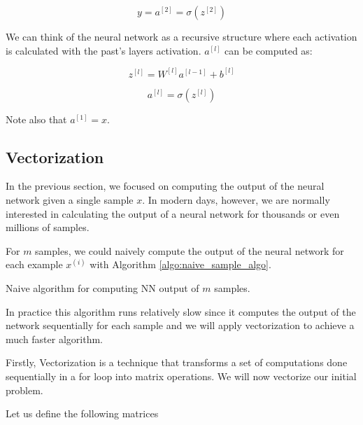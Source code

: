 \begin{equation}
    y = a^{[2]} = \sigma(z^{[2]})
\end{equation}

We can think of the neural network as a recursive structure where each activation is calculated with the past's layers activation.
$a^{[l]}$ can be computed as:

\begin{equation}
    z^{[l]} = W^{[l]}a^{[l-1]} + b^{[l]}
    \label{eq:nn}
\end{equation}

\begin{equation}
    a^{[l]} = \sigma(z^{[l]})
\end{equation}

Note also that $a^{[1]} = x$.

\subsection{Vectorization}

In the previous section, we focused on computing the output of the neural network given a single sample $x$.
In modern days, however,  we are normally interested in calculating the output of a neural network for thousands or even millions of samples.

For $m$ samples, we could naively compute the output of the neural network for each example $x^{(i)}$ with Algorithm \ref{algo:naive_sample_algo}.

\begin{algorithm}[H]
    \DontPrintSemicolon
    \SetAlgoLined
    \caption{Naive algorithm for computing NN output of $m$ samples.}
    \label{algo:naive_sample_algo}
\end{algorithm}

In practice this algorithm runs relatively slow since it computes the output of the network sequentially for each sample and 
we will apply vectorization to achieve a much faster algorithm.

Firstly, Vectorization is a technique that transforms a set of computations done sequentially in a for loop into matrix operations.
We will now vectorize our initial problem.

Let us define the following matrices

